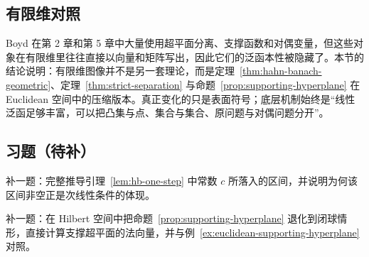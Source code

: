 \subsection*{有限维对照}

Boyd 在第 2 章和第 5 章中大量使用超平面分离、支撑函数和对偶变量，但这些对象在有限维里往往直接以向量和矩阵写出，因此它们的泛函本性被隐藏了。本节的结论说明：有限维图像并不是另一套理论，而是定理~\ref{thm:hahn-banach-geometric}、定理~\ref{thm:strict-separation} 与命题~\ref{prop:supporting-hyperplane} 在 Euclidean 空间中的压缩版本。真正变化的只是表面符号；底层机制始终是“线性泛函足够丰富，可以把凸集与点、集合与集合、原问题与对偶问题分开”。

\subsection*{习题（待补）}

\begin{exercise}[一步延拓公式占位]\label{exr:hahn-banach-one-step-placeholder}
补一题：完整推导引理~\ref{lem:hb-one-step} 中常数 $c$ 所落入的区间，并说明为何该区间非空正是次线性条件的体现。
\end{exercise}

\begin{exercise}[支撑超平面桥接题占位]\label{exr:supporting-hyperplane-placeholder}
补一题：在 Hilbert 空间中把命题~\ref{prop:supporting-hyperplane} 退化到闭球情形，直接计算支撑超平面的法向量，并与例~\ref{ex:euclidean-supporting-hyperplane} 对照。
\end{exercise}
